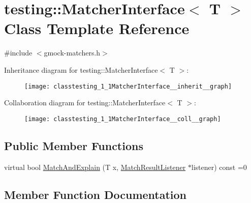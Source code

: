 \hypertarget{classtesting_1_1MatcherInterface}{}\section{testing\+:\+:Matcher\+Interface$<$ T $>$ Class Template Reference}
\label{classtesting_1_1MatcherInterface}


{\ttfamily \#include $<$gmock-\/matchers.\+h$>$}



Inheritance diagram for testing\+:\+:Matcher\+Interface$<$ T $>$\+:\nopagebreak
\begin{figure}[H]
\begin{center}
\leavevmode
\texttt{[image: classtesting\_1\_1MatcherInterface\_\_inherit\_\_graph]}
\end{center}
\end{figure}


Collaboration diagram for testing\+:\+:Matcher\+Interface$<$ T $>$\+:\nopagebreak
\begin{figure}[H]
\begin{center}
\leavevmode
\texttt{[image: classtesting\_1\_1MatcherInterface\_\_coll\_\_graph]}
\end{center}
\end{figure}
\subsection*{Public Member Functions}
\begin{DoxyCompactItemize}
\item 
virtual bool \hyperlink{classtesting_1_1MatcherInterface_a296b43607cd99d60365f0e6a762777cf}{Match\+And\+Explain} (T x, \hyperlink{classtesting_1_1MatchResultListener}{Match\+Result\+Listener} $\ast$listener) const =0
\end{DoxyCompactItemize}


\subsection{Member Function Documentation}
